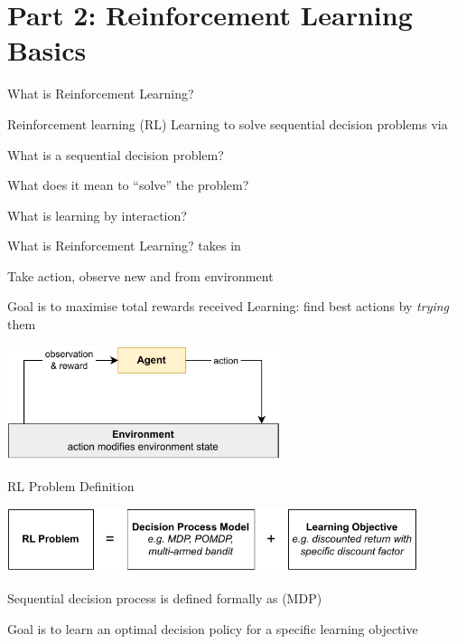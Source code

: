 \section{Part 2: Reinforcement Learning Basics}

	\begin{frame}{What is Reinforcement Learning?}
		\begin{graytitlebox}{Reinforcement learning (RL)}
			Learning to solve sequential decision problems via  %
		\end{graytitlebox}
		\vspace{10pt}
		\blist
			\item What is a sequential decision problem?
			\item What does it mean to ``solve'' the problem?
			\item What is learning by interaction?
		\elist
	\end{frame}

	\begin{frame}[t]{What is Reinforcement Learning?}
		 takes  in 
		\blist
			\item Take action, observe new  and  from environment
			\item Goal is to maximise total rewards received
			\listtab Learning: find best actions by {\it trying} them
		\elist
		\begin{center}
			 \includegraphics[width=0.6\textwidth]{images/chapter_2/RL-loop.pdf}
		\end{center}
	\end{frame}
	
\begin{frame}{RL Problem Definition}

    \begin{center}
        \includegraphics[width=0.9\textwidth]{images/chapter_2/rl-learning-problem.pdf}
    \end{center}

    \blist
        \item Sequential decision process is defined formally as  (MDP)
        \item Goal is to learn an optimal decision policy for a specific learning objective
    \elist
    
\end{frame}

